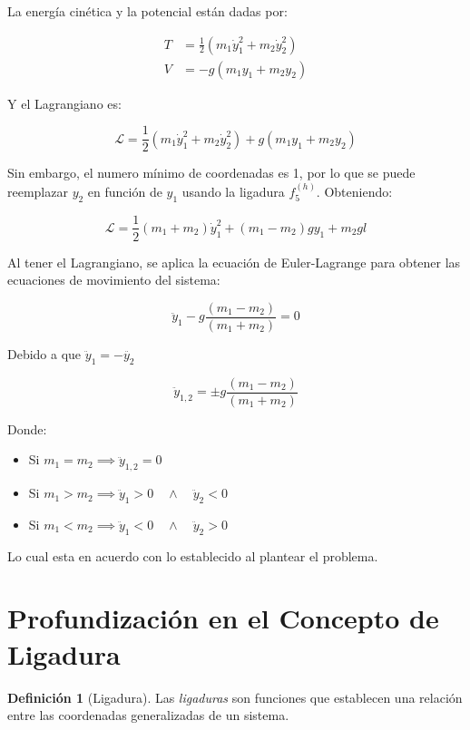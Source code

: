 \documentclass{article}
\theoremstyle{definition}
\newtheorem*{definition}{Definición}
\begin{document}
La energía cinética y la potencial están dadas por:

\begin{align}
	T &= \frac{1}{2} \left(m_1 \dot{y}_1^2 + m_2 \dot{y}_2^2 \right) \\
	V &= -g \left(m_1 y_1 + m_2 y_2 \right)
\end{align}

Y el Lagrangiano es:

\begin{equation}
	\mathcal{L} = \frac{1}{2} \left(m_1 \dot{y}_1^2 + m_2 \dot{y}_2^2 \right) + g \left(m_1 y_1 + m_2 y_2 \right)
\end{equation}

Sin embargo, el numero mínimo de coordenadas es 1, por lo que se puede reemplazar $y_2$ en función de $y_1$ usando la ligadura $f_5^{(h)}$. Obteniendo:

\begin{equation}
	\mathcal{L} = \frac{1}{2} \left(m_1 + m_2 \right) \dot{y}_1^2 + \left(m_1 - m_2 \right)g y_1 + m_2 gl
\end{equation}

Al tener el Lagrangiano, se aplica la ecuación de Euler-Lagrange para obtener las ecuaciones de movimiento del sistema:

\begin{equation}
	\ddot{y}_1 - g\frac{\left(m_1 - m_2 \right)}{\left(m_1 + m_2\right)} = 0
\end{equation}

Debido a que $\ddot{y}_1 = -\ddot{y_2}$

\begin{equation}
	\ddot{y}_{1,2} = \pm g \frac{\left(m_1 - m_2 \right)}{\left(m_1 + m_2\right)}
\end{equation}

Donde:

\begin{itemize}
	\item Si $m_1 = m_2 \implies \ddot{y}_{1,2} = 0$
	\item Si $m_1 > m_2 \implies \ddot{y}_1 > 0 \quad \land \quad \ddot{y}_2 < 0$
	\item Si $m_1 < m_2 \implies \ddot{y}_1 < 0 \quad \land \quad  \ddot{y}_2 > 0$
\end{itemize}

Lo cual esta en acuerdo con lo establecido al plantear el problema.

\section{Profundización en el Concepto de Ligadura}
\begin{definition}[Ligadura]
	Las \emph{ligaduras} son funciones que establecen una relación entre las coordenadas generalizadas de un sistema.
\end{definition}
\end{document}
